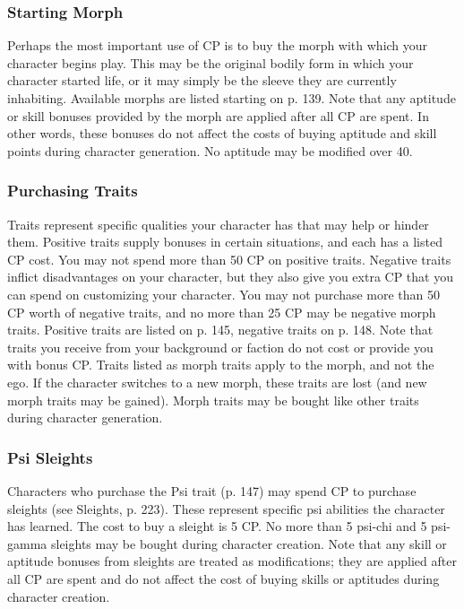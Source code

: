 \subsubsection{Starting Morph}
\label{sec:starting-morph}

Perhaps the most important use of CP is to buy the morph with which your character begins play. This may be the original bodily form in which your character started life, or it may simply be the sleeve they are currently inhabiting. Available morphs are listed starting on p. 139. Note that any aptitude or skill bonuses provided by the morph are applied after all CP are spent. In other words, these bonuses do not affect the costs of buying aptitude and skill points during character generation. No aptitude may be modified over 40.

\subsubsection{Purchasing Traits}
\label{sec:purchasing-traits}

Traits represent specific qualities your character has that may help or hinder them. Positive traits supply bonuses in certain situations, and each has a listed CP cost. You may not spend more than 50 CP on positive traits. Negative traits inflict disadvantages on your character, but they also give you extra CP that you can spend on customizing your character. You may not purchase more than 50 CP worth of negative traits, and no more than 25 CP may be negative morph traits. Positive traits are listed on p. 145, negative traits on p. 148. Note that traits you receive from your background or faction do not cost or provide you with bonus CP. Traits listed as morph traits apply to the morph, and not the ego. If the character switches to a new morph, these traits are lost (and new morph traits may be gained). Morph traits may be bought like other traits during character generation.

\subsubsection{Psi Sleights}
\label{sec:purchasing-psi-sleights}

Characters who purchase the Psi trait (p. 147) may spend CP to purchase sleights (see Sleights, p. 223). These represent specific psi abilities the character has learned. The cost to buy a sleight is 5 CP. No more than 5 psi-chi and 5 psi-gamma sleights may be bought during character creation. Note that any skill or aptitude bonuses from sleights are treated as modifications; they are applied after all CP are spent and do not affect the cost of buying skills or aptitudes during character creation.

